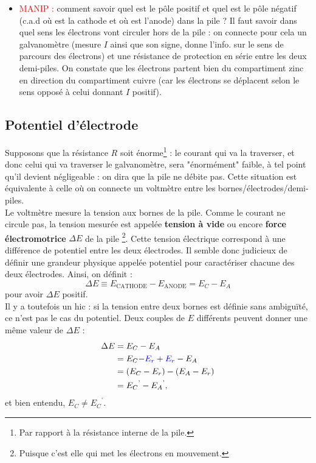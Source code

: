 \documentclass[11pt,a4paper]{report}
\begin{document}
\begin{itemize}
	\item \textcolor{red}{MANIP :} comment savoir quel est le pôle positif et quel est le pôle négatif (c.a.d où est la cathode et où est l'anode) dans la pile ? Il faut savoir dans quel sens les électrons vont circuler hors de la pile : on connecte pour cela un galvanomètre (mesure $I$ ainsi que son signe, donne l'info. sur le sens de parcours des électrons) et une résistance de protection en série entre les deux demi-piles. On constate que les électrons partent bien du compartiment zinc en direction du compartiment cuivre (car les électrons se déplacent selon le sens opposé à celui donnant $I$ positif).
\end{itemize}

\subsection{Potentiel d'électrode}

Supposons que la résistance $R$ soit énorme\footnote{Par rapport à la résistance interne de la pile.} : le courant qui va la traverser, et donc celui qui va traverser le galvanomètre, sera "énormément" faible, à tel point qu'il devient négligeable : on dira que la pile ne débite pas. Cette situation est équivalente à celle où on connecte un voltmètre entre les bornes/électrodes/demi-piles.\\

Le voltmètre mesure la tension aux bornes de la pile. Comme le courant ne circule pas, la tension mesurée est appelée \textbf{tension à vide} ou encore \textbf{force électromotrice} $\Delta E$ de la pile \footnote{Puisque c'est elle qui met les électrons en mouvement.}. Cette tension électrique correspond à une différence de potentiel entre les deux électrodes. Il semble donc judicieux de définir une grandeur physique appelée potentiel pour caractériser chacune des deux électrodes. Ainsi, on définit :
\begin{equation}
	\boxed{\Delta E \equiv E_\text{CATHODE} - E_\text{ANODE} = E_C - E_A}
\end{equation}
pour avoir $\Delta E$ positif.\\

Il y a toutefois un hic : si la tension entre deux bornes est définie sans ambiguïté, ce n'est pas le cas du potentiel. Deux couples de $E$ différents peuvent donner une même valeur de $\Delta E$ :
\begin{equation}
	\begin{split}
	\Delta E & = E_C - E_A \\
 			 & = E_C \textcolor{blue}{- E_r + E_r} - E_A \\
 			 & = (E_C - E_r) - (E_A - E_r) \\
 			 & = {E_C}^{\text{'}} - {E_A}^{\text{'}},
	\end{split}
\end{equation}
et bien entendu, $E_C \neq {E_C}^{\text{'}}$.\\ 
\end{document}
